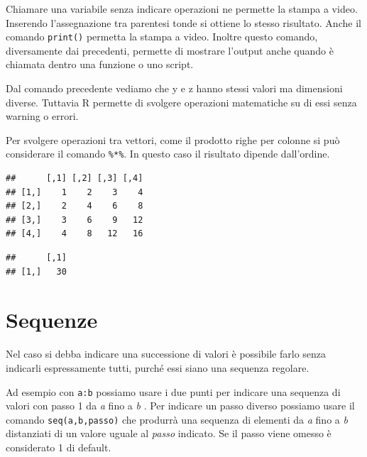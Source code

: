 \documentclass[]{book}
\newenvironment{Shaded}{\begin{snugshade}}{\end{snugshade}}
\newcommand{\NormalTok}[1]{#1}
\newcommand{\OperatorTok}[1]{\textcolor[rgb]{0.81,0.36,0.00}{\textbf{#1}}}
\newcommand{\StringTok}[1]{\textcolor[rgb]{0.31,0.60,0.02}{#1}}
\begin{document}
Chiamare una variabile senza indicare operazioni ne permette la stampa a video. Inserendo l'assegnazione tra parentesi tonde si ottiene lo stesso risultato. Anche il comando \texttt{print()} permetta la stampa a video. Inoltre questo comando, diversamente dai precedenti, permette di mostrare l'output anche quando è chiamata dentro una funzione o uno script.

Dal comando precedente vediamo che y e z hanno stessi valori ma dimensioni diverse. Tuttavia R permette di svolgere operazioni matematiche su di essi senza warning o errori.

Per svolgere operazioni tra vettori, come il prodotto righe per colonne si può considerare il comando \texttt{\%*\%}. In questo caso il risultato dipende dall'ordine.

\begin{Shaded}
\end{Shaded}

\begin{verbatim}
##      [,1] [,2] [,3] [,4]
## [1,]    1    2    3    4
## [2,]    2    4    6    8
## [3,]    3    6    9   12
## [4,]    4    8   12   16
\end{verbatim}

\begin{Shaded}
\end{Shaded}

\begin{verbatim}
##      [,1]
## [1,]   30
\end{verbatim}

\hypertarget{sequenze}{%
\section{Sequenze}\label{sequenze}}

Nel caso si debba indicare una successione di valori è possibile farlo senza indicarli espressamente tutti, purché essi siano una sequenza regolare.

Ad esempio con \texttt{a:b} possiamo usare i due punti per indicare una sequenza di valori con passo 1 da \emph{a} fino a \emph{b} . Per indicare un passo diverso possiamo usare il comando \texttt{seq(a,b,passo)} che produrrà una sequenza di elementi da \emph{a} fino a \emph{b} distanziati di un valore uguale al \emph{passo} indicato. Se il passo viene omesso è considerato 1 di default.
\end{document}
